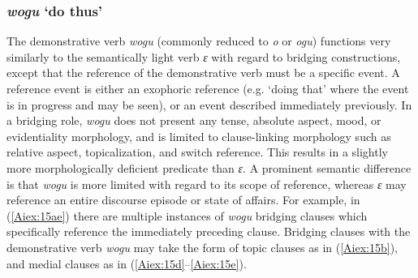 \documentclass[output=paper]{LSP/langsci}
\begin{document}
\subsubsection{\textit{wogu} `do thus'} 
\label{Aidemonverb.wogu}
The demonstrative verb \textit{wogu} (commonly reduced to \textit{o} or \textit{ogu}) functions very similarly to the semantically light verb \textit{ɛ} with regard to bridging constructions, except that the reference of the demonstrative verb must be a specific event. A reference event is either an exophoric reference (e.g. `doing that' where the event is in progress and may be seen), or an event described immediately previously. In a bridging role, \textit{wogu} does not present any tense, absolute aspect, mood, or evidentiality morphology, and is limited to clause-linking morphology such as relative aspect, topicalization, and switch reference. This results in a slightly more morphologically deficient predicate than \textit{ɛ}. A prominent semantic difference is that \textit{wogu} is more limited with regard to its scope of reference, whereas \textit{ɛ} may reference an entire discourse episode or state of affairs. For example, in (\ref{Aiex:15ae}) there are multiple instances of \textit{wogu} bridging clauses which specifically reference the immediately preceding clause. Bridging clauses with the demonstrative verb \textit{wogu} may take the form of topic clauses as in (\ref{Aiex:15b}), and medial clauses as in (\ref{Aiex:15d}--\ref{Aiex:15e}).
\end{document}
